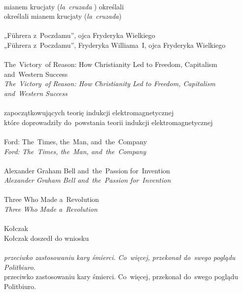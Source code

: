 \documentclass[a4paper,11pt]{article}
\numberwithin{equation}{section}
\begin{document}
\noindent
{} \\
\Jest mianem krucjaty (\textit{la~cruzada} ) określali \\
\PowinnoByc określali mianem krucjaty (\textit{la~cruzada}) \\
 \\
\Jest „F\"{u}hrera z~Poczdamu”, ojca Fryderyka Wielkiego \\
\PowinnoByc „F\"{u}hrera z~Poczdamu”, Fryderyka Williama~I, ojca Fryderyka
Wielkiego \\
 \\
\Jest The~Victory~of Reason: How Christianity Led to Freedom,
Capitalism and~Western Success \\
\PowinnoByc \textit{The~Victory~of Reason: How Christianity Led to Freedom,
  Capitalism and~Western Success} \\
 \\
\Jest zapoczątkowujących teorię indukcji elektromagnetycznej \\
\PowinnoByc które doprowadziły do~powstania teorii indukcji
elektromagnetycznej \\
 \\
\Jest Ford: The~Times, the~Man, and~the~Company \\
\PowinnoByc \textit{Ford: The~Times, the~Man, and~the~Company} \\
 \\
\Jest Alexander Graham Bell and~the~Passion for~Invention \\
\PowinnoByc \textit{Alexander Graham Bell and~the~Passion for~Invention} \\
 \\
\Jest Three Who Made a~Revolution \\
\PowinnoByc \textit{Three Who Made a~Revolution} \\
 \\
\Jest Kołczak \\
\PowinnoByc Kołczak doszedł do wniosku \\
 \\
\Jest \textit{przeciwko zastosowaniu kary śmierci. Co~więcej,
  przekonał do~swego poglądu Politbiuro.} \\
\PowinnoByc przeciwko zastosowaniu kary śmierci. Co~więcej, przekonał
do~swego poglądu Politbiuro. \\
 \\
\end{document}
